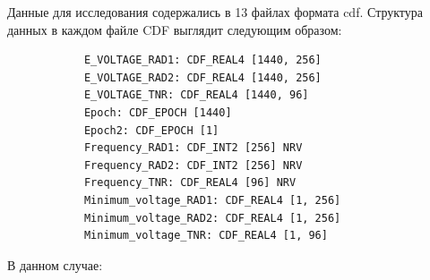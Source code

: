 \documentclass[spec, och, diploma]{SCWorks}
\begin{document}
        Данные для исследования содержались в 13 файлах формата cdf. Структура
        данных в каждом файле CDF выглядит следующим образом:

        \begin{verbatim}
            E_VOLTAGE_RAD1: CDF_REAL4 [1440, 256]
            E_VOLTAGE_RAD2: CDF_REAL4 [1440, 256]
            E_VOLTAGE_TNR: CDF_REAL4 [1440, 96]
            Epoch: CDF_EPOCH [1440]
            Epoch2: CDF_EPOCH [1]
            Frequency_RAD1: CDF_INT2 [256] NRV
            Frequency_RAD2: CDF_INT2 [256] NRV
            Frequency_TNR: CDF_REAL4 [96] NRV
            Minimum_voltage_RAD1: CDF_REAL4 [1, 256]
            Minimum_voltage_RAD2: CDF_REAL4 [1, 256]
            Minimum_voltage_TNR: CDF_REAL4 [1, 96]
        \end{verbatim}

        В данном случае:
        
\end{document}

